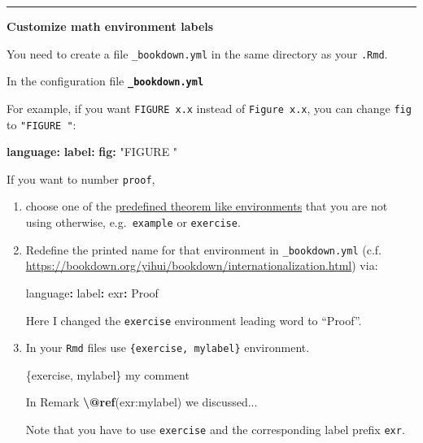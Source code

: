 \documentclass[
  a4paper,
  twoside,
  openright]{book}
\newenvironment{Shaded}{\begin{snugshade}}{\end{snugshade}}
\newcommand{\AttributeTok}[1]{\textcolor[rgb]{0.13,0.29,0.53}{#1}}
\newcommand{\FunctionTok}[1]{\textcolor[rgb]{0.13,0.29,0.53}{\textbf{#1}}}
\newcommand{\KeywordTok}[1]{\textcolor[rgb]{0.13,0.29,0.53}{\textbf{#1}}}
\newcommand{\NormalTok}[1]{#1}
\newcommand{\SpecialCharTok}[1]{\textcolor[rgb]{0.81,0.36,0.00}{\textbf{#1}}}
\newcommand{\StringTok}[1]{\textcolor[rgb]{0.31,0.60,0.02}{#1}}
\theoremstyle{definition}
\theoremstyle{definition}
\theoremstyle{definition}
\theoremstyle{definition}
\theoremstyle{remark}
\begin{document}
\begin{center}\rule{0.5\linewidth}{0.5pt}\end{center}

\textbf{Customize math environment labels}

You need to create a file \texttt{\_bookdown.yml} in the same directory as your \texttt{.Rmd}.

In the configuration file \textbf{\texttt{\_bookdown.yml}}

For example, if you want \texttt{FIGURE\ x.x} instead of \texttt{Figure\ x.x}, you can change \texttt{fig} to \texttt{"FIGURE\ "}:

\begin{Shaded}
\begin{Highlighting}[]
\FunctionTok{language}\KeywordTok{:}
\AttributeTok{  }\FunctionTok{label}\KeywordTok{:}
\AttributeTok{    }\FunctionTok{fig}\KeywordTok{:}\AttributeTok{ }\StringTok{"FIGURE "}
\end{Highlighting}
\end{Shaded}

If you want to number \texttt{proof},

\begin{enumerate}
\def\labelenumi{\arabic{enumi}.}
\item
  choose one of the \href{https://bookdown.org/yihui/bookdown/markdown-extensions-by-bookdown.html\#theorems}{predefined theorem like environments} that you are not using otherwise, e.g.~\texttt{example} or \texttt{exercise}.
\item
  Redefine the printed name for that environment in \texttt{\_bookdown.yml} (c.f. \url{https://bookdown.org/yihui/bookdown/internationalization.html}) via:

\begin{Shaded}
\begin{Highlighting}[]
\NormalTok{language}\SpecialCharTok{:}
\NormalTok{  label}\SpecialCharTok{:}
\NormalTok{    exr}\SpecialCharTok{:} \StringTok{\textquotesingle{}Proof \textquotesingle{}}
\end{Highlighting}
\end{Shaded}

  Here I changed the \texttt{exercise} environment leading word to ``Proof''.
\item
  In your \texttt{Rmd} files use \texttt{\{exercise,\ mylabel\}} environment.

\begin{Shaded}
\begin{Highlighting}[]
\NormalTok{\textasciigrave{}\textasciigrave{}\textasciigrave{}\{exercise, mylabel\}}
\NormalTok{my comment}
\NormalTok{\textasciigrave{}\textasciigrave{}\textasciigrave{}}

\NormalTok{In Remark }\FunctionTok{\textbackslash{}@ref}\NormalTok{(exr:mylabel) we discussed...}
\end{Highlighting}
\end{Shaded}

  Note that you have to use \texttt{exercise} and the corresponding label prefix \texttt{exr}.
\end{enumerate}
\end{document}
